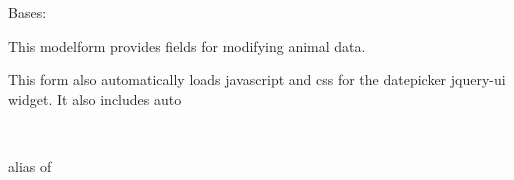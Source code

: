 \documentclass[letterpaper,10pt,english]{sphinxmanual}
\begin{document}
\begin{fulllineitems}
\label{api:mousedb.animal.forms.AnimalForm}
Bases: 

This modelform provides fields for modifying animal data.

This form also automatically loads javascript and css for the datepicker jquery-ui widget.  It also includes auto


\begin{fulllineitems}
\label{api:mousedb.animal.forms.AnimalForm.Media}
\end{fulllineitems}



\begin{fulllineitems}
\label{api:mousedb.animal.forms.AnimalForm.Meta}~

\begin{fulllineitems}
\label{api:mousedb.animal.forms.AnimalForm.Meta.model}
alias of 

\end{fulllineitems}


\end{fulllineitems}



\begin{fulllineitems}
\label{api:mousedb.animal.forms.AnimalForm.media}
\end{fulllineitems}


\end{fulllineitems}


\end{document}
